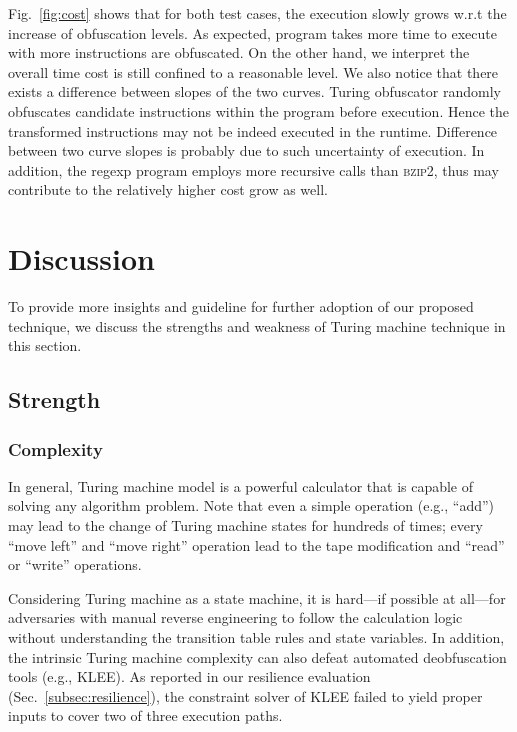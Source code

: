 \documentclass[lnicst]{svmultln}
\newcommand{\F}{Fig.}
\begin{document}
\F~\ref{fig:cost} shows that for both test cases, the execution slowly grows
w.r.t the increase of obfuscation levels. As expected, program takes more time
to execute with more instructions are obfuscated. On the other hand, we
interpret the overall time cost is still confined to a reasonable level. We also
notice that there exists a difference between slopes of the two curves. Turing
obfuscator randomly obfuscates candidate instructions within the program before
execution. Hence the transformed instructions may not be indeed executed in the
runtime. Difference between two curve slopes is probably due to such uncertainty
of execution. In addition, the regexp program employs more recursive calls than
\textsc{bzip2}, thus may contribute to the relatively higher cost grow as well.



\section{Discussion}
To provide more insights and guideline for further adoption of our proposed
technique, we discuss the strengths and weakness of Turing machine technique in
this section.

\subsection{Strength}

\subsubsection{Complexity}
In general, Turing machine model is a powerful calculator that is capable of
solving any algorithm problem. Note that even a simple operation (e.g., ``add'')
may lead to the change of Turing machine states for hundreds of times; every
``move left'' and ``move right'' operation lead to the tape modification and
``read'' or ``write'' operations.

Considering Turing machine as a state machine, it is hard---if possible at
all---for adversaries with manual reverse engineering to follow the calculation
logic without understanding the transition table rules and state variables. In
addition, the intrinsic Turing machine complexity can also defeat automated
deobfuscation tools (e.g., KLEE). As reported in our resilience evaluation
(Sec.~\ref{subsec:resilience}), the constraint solver of KLEE failed to yield
proper inputs to cover two of three execution paths.
\end{document}
